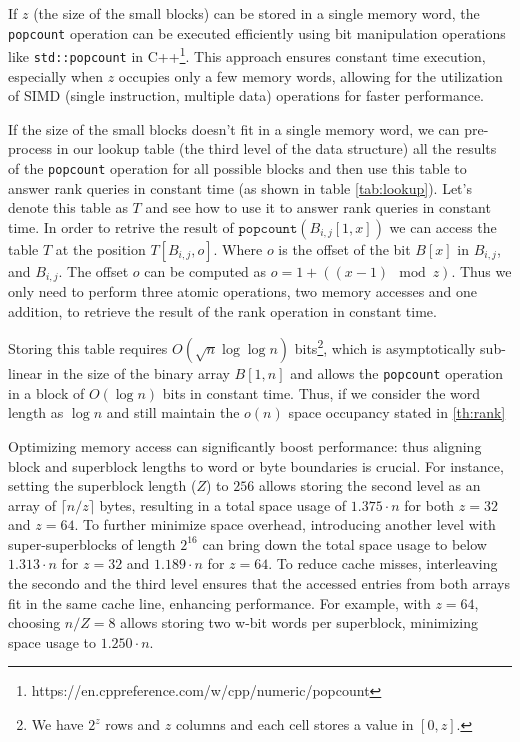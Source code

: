 \begin{remark}
    If $z$ (the size of the small blocks) can be stored in a single memory word, the \texttt{popcount} operation can be executed efficiently using bit manipulation operations like \texttt{std::popcount} in C++\footnote{https://en.cppreference.com/w/cpp/numeric/popcount}. This approach ensures constant time execution, especially when $z$ occupies only a few memory words, allowing for the utilization of SIMD (single instruction, multiple data) operations for faster performance. \cite{ferragina2023pearls}
\end{remark}

\noindent If the size of the small blocks doesn't fit in a single memory word, we can pre-process in our lookup table (the third level of the data structure) all the results of the \texttt{popcount} operation for all possible blocks and then use this table to answer rank queries in constant time (as shown in table \ref{tab:lookup}). Let's denote this table as $T$ and see how to use it to answer rank queries in constant time. In order to retrive the result of $\texttt{popcount}(B_{i,j}[1,x])$ we can access the table $T$ at the position $T[B_{i,j}, o]$. Where $o$ is the offset of the bit $B[x]$ in $B_{i,j}$, and $B_{i,j}$. The offset $o$ can be computed as $o = 1 + ((x-1) \mod z)$. Thus we only need to perform three atomic operations, two memory accesses and one addition, to retrieve the result of the rank operation in constant time.

\noindent Storing this table requires $O(\sqrt{n} \log \log n)$ bits\footnote{We have $2^z$ rows and $z$ columns and each cell stores a value in $[0, z]$.}, which is asymptotically sub-linear in the size of the binary array $B[1, n]$ and allows the \texttt{popcount} operation in a block of $O(\log n)$ bits in constant time. Thus, if we consider the word length as $\log n$ and still maintain the $o(n)$ space occupancy stated in \ref{th:rank}


\begin{remark}
    Optimizing memory access can significantly boost performance: thus aligning block and superblock lengths to word or byte boundaries is crucial. For instance, setting the superblock length ($Z$) to $256$ allows storing the second level as an array of $\lceil n/z \rceil$ bytes, resulting in a total space usage of $1.375 \cdot n$ for both $z = 32$ and $z = 64$. To further minimize space overhead, introducing another level with super-superblocks of length $2^{16}$ can bring down the total space usage to below $1.313 \cdot n$ for $z = 32$ and $1.189 \cdot n$ for $z = 64$. To reduce cache misses, interleaving the secondo and the third level ensures that the accessed entries from both arrays fit in the same cache line, enhancing performance. For example, with $z = 64$, choosing $n/Z = 8$ allows storing two w-bit words per superblock, minimizing space usage to $1.250 \cdot n$. \cite{navarro2016compact}
\end{remark}

